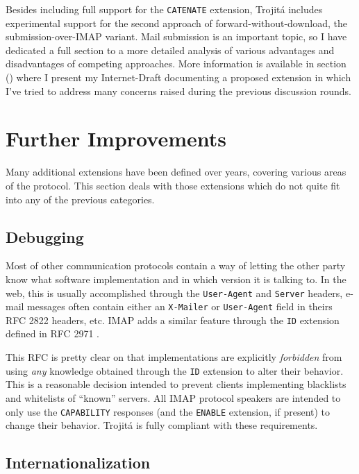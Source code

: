 \documentclass[trojita]{subfiles}
\begin{document}
Besides including full support for the {\tt CATENATE} extension, Trojitá includes experimental support for the second
approach of forward-without-download, the submission-over-IMAP variant.  Mail submission is an important topic, so I
have dedicated a full section to a more detailed analysis of various advantages and disadvantages of competing
approaches.  More information is available in section () where I present my Internet-Draft
documenting a proposed extension in which I've tried to address many concerns raised during the previous discussion
rounds.

\section{Further Improvements}

Many additional extensions have been defined over years, covering various areas of the protocol.  This section deals
with those extensions which do not quite fit into any of the previous categories.

\subsection{Debugging}

Most of other communication protocols contain a way of letting the other party know what software implementation and in
which version it is talking to.  In the web, this is usually accomplished through the {\tt User-Agent} and {\tt Server}
headers, e-mail messages often contain either an {\tt X-Mailer} or {\tt User-Agent} field in theirs RFC 2822 headers,
etc.  IMAP adds a similar feature through the {\tt ID} extension defined in RFC 2971 \cite{rfc2971}.

This RFC is pretty clear on that implementations are explicitly {\em forbidden} from using {\em any} knowledge obtained
through the {\tt ID} extension to alter their behavior.  This is a reasonable decision intended to prevent clients
implementing blacklists and whitelists of ``known'' servers.  All IMAP protocol speakers are intended to only use the
{\tt CAPABILITY} responses (and the {\tt ENABLE} extension, if present) to change their behavior.  Trojitá is fully
compliant with these requirements.

\subsection{Internationalization}
\end{document}
